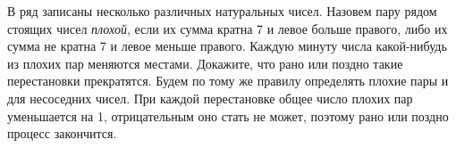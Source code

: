 \problem{}
В ряд записаны несколько различных натуральных чисел.
Назовем пару рядом стоящих чисел \emph{плохой}, если их сумма кратна 7 и левое
больше правого, либо их сумма не кратна 7 и левое меньше правого.
Каждую минуту числа какой-нибудь из плохих пар меняются местами.
Докажите, что рано или поздно такие перестановки прекратятся.
\solution
Будем по тому же правилу определять плохие пары и для несоседних чисел.
При каждой перестановке общее число плохих пар уменьшается на 1, отрицательным
оно стать не может, поэтому рано или поздно процесс закончится.
\endproblem
